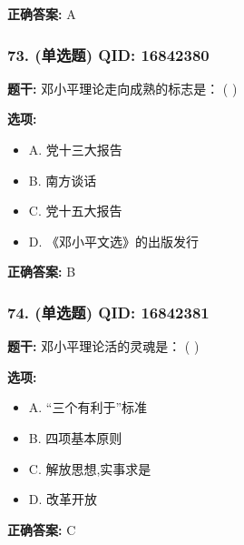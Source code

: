 \documentclass[12pt,UTF8]{ctexart}
\begin{document}
\textbf{正确答案:}
A

\vspace{0.3em}\hrulefill\vspace{0.7em}

\subsubsection*{73. (单选题) \small QID: 16842380}

\textbf{题干:}
邓小平理论走向成熟的标志是： ( )

\textbf{选项:}
\begin{itemize}[leftmargin=*]

  \item A. 党十三大报告

  \item B. 南方谈话

  \item C. 党十五大报告

  \item D. 《邓小平文选》的出版发行

\end{itemize}

\textbf{正确答案:}
B

\vspace{0.3em}\hrulefill\vspace{0.7em}

\subsubsection*{74. (单选题) \small QID: 16842381}

\textbf{题干:}
邓小平理论活的灵魂是： ( )

\textbf{选项:}
\begin{itemize}[leftmargin=*]

  \item A. “三个有利于”标准

  \item B. 四项基本原则

  \item C. 解放思想,实事求是

  \item D. 改革开放

\end{itemize}

\textbf{正确答案:}
C

\vspace{0.3em}\hrulefill\vspace{0.7em}
\end{document}
